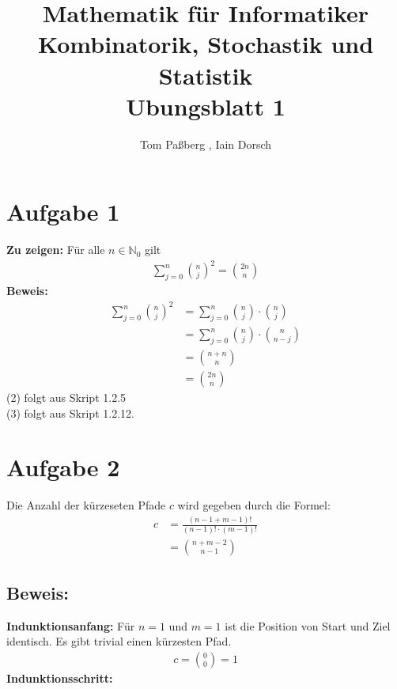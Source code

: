 \documentclass[a4paper]{scrartcl}
\title{Mathematik für Informatiker \\ Kombinatorik, Stochastik und Statistik \\ Ubungsblatt 1}
\author{Tom Paßberg , Iain Dorsch}
\date{}
\begin{document}
\maketitle

\newpage
\section*{Aufgabe 1}
\textbf{Zu zeigen:} Für alle $n \in \mathbb{N}_0$ gilt
\begin{align*}
    \sum_{j=0}^{n} \binom{n}{j}^2 = \binom{2n}{n}
\end{align*}
\textbf{Beweis:}
\begin{align}
    \sum_{j=0}^{n} \binom{n}{j}^2 &= \sum_{j=0}^{n} \binom{n}{j} \cdot \binom{n}{j} \\
    &= \sum_{j=0}^{n} \binom{n}{j} \cdot \binom{n}{n - j} \\
    &= \binom{n + n}{n} \\
    &= \binom{2n}{n}
\end{align}
(2) folgt aus Skript 1.2.5 \\
(3) folgt aus Skript 1.2.12.\\

\section*{Aufgabe 2}
Die Anzahl der kürzeseten Pfade $c$ wird gegeben durch die Formel:
\begin{align*}
    c &= \frac{(n - 1 + m  - 1)!}{(n-1)! \cdot (m-1)!} \\[12px]
    &= \binom{n + m - 2}{n - 1}
\end{align*}

\subsection*{Beweis:}
\textbf{Indunktionsanfang:}
Für $n = 1$ und $m = 1$ ist die Position von Start und Ziel identisch. 
Es gibt trivial einen kürzesten Pfad. \\
\begin{align*}
    c = \binom{0}{0} = 1
\end{align*}
\textbf{Indunktionsschritt:}
\end{document}
